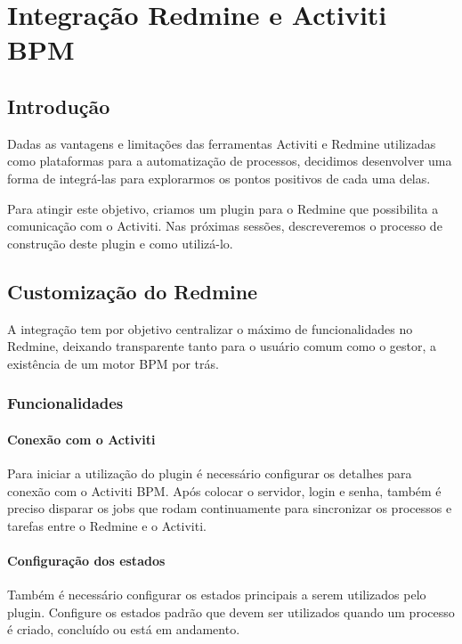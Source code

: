 \chapter{Integração Redmine e Activiti BPM}\label{chp:integracao_redmine_activiti}

\section{Introdução}\label{sec:integracao_redmine_activiti-introducao}
Dadas as vantagens e limitações das ferramentas Activiti e Redmine utilizadas como plataformas para a automatização de processos, decidimos desenvolver uma forma de integrá-las para explorarmos os pontos positivos de cada uma delas.

Para atingir este objetivo, criamos um plugin para o Redmine que possibilita a comunicação com o Activiti. Nas próximas sessões, descreveremos o processo de construção deste plugin e como utilizá-lo.


\section{Customização do Redmine}\label{sec:integracao_redmine_activiti-implementacao}

A integração tem por objetivo centralizar o máximo de funcionalidades no Redmine, deixando transparente tanto para o usuário comum como o gestor, a existência de um motor BPM por trás.

\subsection{Funcionalidades}\label{sec:integracao_redmine_activiti_implementacao_funcionalidades}

\subsubsection{Conexão com o Activiti }\label{sec:integracao_redmine_activiti_inplementacao_funcionalidades_conexão}
Para iniciar a utilização do plugin é necessário configurar os detalhes para conexão com o Activiti BPM.
Após colocar o servidor, login e senha, também é preciso disparar os jobs que rodam continuamente para sincronizar os processos e tarefas entre o Redmine e o Activiti.

\subsubsection{Configuração dos estados}\label{sec:integracao_redmine_activiti_inplementacao_funcionalidades_conexão}
Também é necessário configurar os estados principais a serem utilizados pelo plugin.
Configure os estados padrão que devem ser utilizados quando um processo é criado, concluído ou está em andamento.

